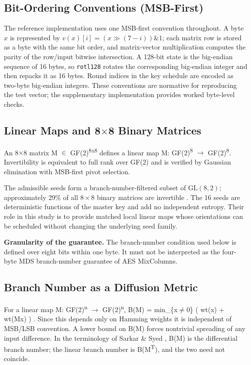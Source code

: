 \documentclass[cryptography,article,submit,oneauthor]{Definitions/mdpi}
\begin{document}
\subsection{Bit-Ordering Conventions (MSB-First)}\label{sec:3-1}
The reference implementation uses one MSB-first convention throughout. A byte $x$ is represented by $v(x)[i]=(x\gg(7-i))\mathbin{\&}1$; each matrix row is stored as a byte with the same bit order, and matrix-vector multiplication computes the parity of the row/input bitwise intersection. A 128-bit state is the big-endian sequence of 16 bytes, so \texttt{rotl128} rotates the corresponding big-endian integer and then repacks it as 16 bytes. Round indices in the key schedule are encoded as two-byte big-endian integers. These conventions are normative for reproducing the test vector; the supplementary implementation provides worked byte-level checks.\par
\subsection[Linear Maps and 8 x 8 Binary Matrices]{Linear Maps and 8\ensuremath{\times}8 Binary Matrices}\label{sec:3-2}
An 8\ensuremath{\times}8 matrix M \ensuremath{\in} GF(2)\textsuperscript{8}\textsuperscript{x}\textsuperscript{8} defines a linear map M: GF(2)\textsuperscript{8} \ensuremath{\rightarrow} GF(2)\textsuperscript{8}. Invertibility is equivalent to full rank over GF(2) and is verified by Gaussian elimination with MSB-first pivot selection.\par
The admissible seeds form a branch-number-filtered subset of $\mathrm{GL}(8,2)$; approximately 29\% of all $8\times8$ binary matrices are invertible \cite{ref12}. The 16 seeds are deterministic functions of the master key and add no independent entropy. Their role in this study is to provide matched local linear maps whose orientations can be scheduled without changing the underlying seed family.\par
\textbf{Granularity of the guarantee. }The branch-number condition used below is defined over eight bits within one byte. It must not be interpreted as the four-byte MDS branch-number guarantee of AES MixColumns.\par
\subsection{Branch Number as a Diffusion Metric}\label{sec:3-3}
\begin{Definition}
For a linear map M: GF(2)\textsuperscript{n} \ensuremath{\rightarrow} GF(2)\textsuperscript{n}, B(M) = min\_\{x\ensuremath{\neq}0\} ( wt(x) + wt(Mx) ) \cite{ref5}. Since this depends only on Hamming weights it is independent of MSB/LSB convention. A lower bound on B(M) forces nontrivial spreading of any input difference. In the terminology of Sarkar \& Syed \cite{ref18}, B(M) is the differential branch number; the linear branch number is B(M\textsuperscript{T}), and the two need not coincide.
\end{Definition}
\end{document}
